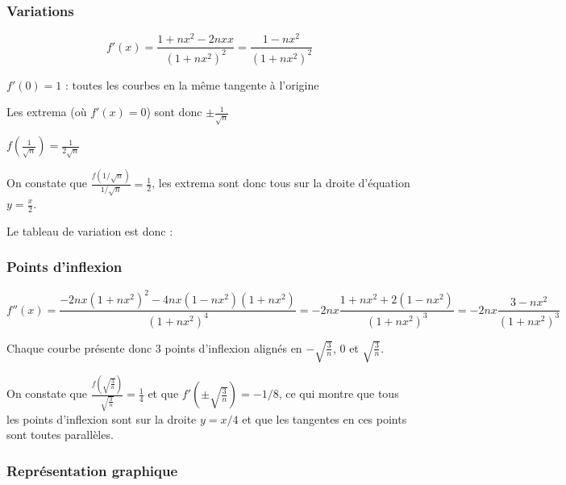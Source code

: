 \documentclass{report}
\begin{document}
\subsubsection*{Variations}

\begin{displaymath}
	f'(x) = \frac{1+nx^2-2nxx}{(1+nx^2)^2}=\frac{1-nx^2}{(1+nx^2)^2}
\end{displaymath}

$f'(0) = 1$ : toutes les courbes en la même tangente à l'origine

Les extrema (où $f'(x)=0$) sont donc $\pm\frac{1}{\sqrt{n}}$

$f(\frac{1}{\sqrt{n}}) = \frac{1}{2\sqrt{n}}$

On constate que $\frac{f(1/\sqrt{n})}{1/\sqrt{n}} = \frac{1}{2}$, les extrema sont donc tous sur la droite
d'équation $y=\frac{x}{2}$.

Le tableau de variation est donc :


\subsubsection*{Points d'inflexion}

\begin{displaymath}
	f''(x) = \frac{-2nx(1+nx^2)^2-4nx(1-nx^2)(1+nx^2)}{(1+nx^2)^4}
	       =-2nx\frac{1+nx^2+2(1-nx^2)}{(1+nx^2)^3}
	       = -2nx\frac{3-nx^2}{(1+nx^2)^3}
\end{displaymath}

Chaque courbe présente donc 3 points d'inflexion alignés en $-\sqrt{\frac{3}{n}}$, $0$ et $\sqrt{\frac{3}{n}}$.

On constate que $\frac{f(\sqrt{\frac{3}{n}})}{\sqrt{\frac{3}{n}}} = \frac{1}{4}$ et que $f'\left({\pm \sqrt{\frac{3}{n}}}\right)=-1/8$, ce qui montre que tous les points d'inflexion sont sur la droite
$y=x/4$ et que les tangentes en ces points sont toutes parallèles.

\subsubsection*{Représentation graphique}
\end{document}

